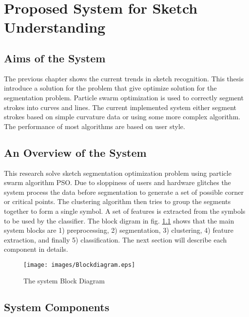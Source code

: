 \chapter{Proposed System for Sketch Understanding}
\section{Aims of the System}
\label{sec:AimsOfTheSystem}
The previous chapter shows the current trends in sketch recognition. This thesis introduce a solution for the problem that give optimize solution for the segmentation problem. Particle swarm optimization is used to correctly segment strokes into curves and lines. The current implemented system either segment strokes based on simple curvature data or using some more complex algorithm. The performance of most algorithms are based on user style. 


\section{An Overview of the System}
\label{sec:AnOverviewOfTheSystem}
   This research solve sketch segmentation optimization problem using particle swarm algorithm PSO.  Due to sloppiness of users and hardware glitches the system process the data before segmentation to generate a set of possible corner or critical points.  The clustering algorithm then tries to group the segments together to form a single symbol. A set of features is extracted from the symbols to be used by the classifier.  %
The block digram in fig. \ref{fig:Blockdiagram} shows that the main system blocks are 1) preprocessing, 2) segmentation, 3) clustering, 4) feature extraction, and finally 5) classification. The next section will describe each component in details. 
\begin{figure}[]
	\centering
		\texttt{[image: images/Blockdiagram.eps]}
	\caption[  ]{The system Block Diagram}
	\label{fig:Blockdiagram}
\end{figure}
 

\section{System Components}
\label{sec:SystemComponents}
 
